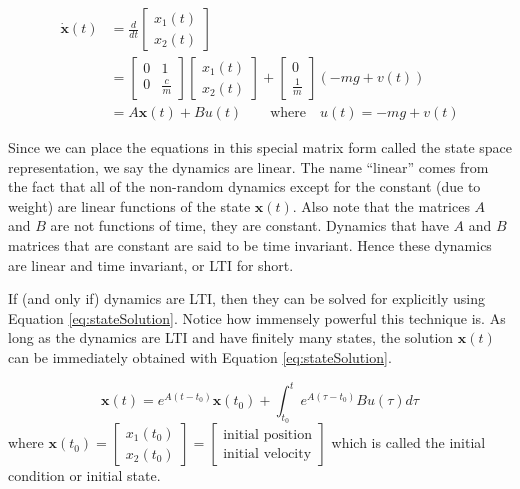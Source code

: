 \documentclass{article}
\begin{document}
\begin{align}
\label{eq:stateSpaceDynamics}
\dot{\pmb{x}}(t) &= \frac{d}{dt}\begin{bmatrix}x_1(t)\\x_2(t)\end{bmatrix} \nonumber\\
&=\begin{bmatrix} 0 & 1\\ 0 & \frac{c}{m}\end{bmatrix} \begin{bmatrix}x_1(t) \\ x_2(t)\end{bmatrix}+\begin{bmatrix}0\\\frac{1}{m}\end{bmatrix}(-mg+v(t)) \nonumber\\
&= A\pmb{x}(t)+Bu(t) \qquad \textrm{where} \quad u(t) = -mg+v(t)
\end{align}

Since we can place the equations in this special matrix form called the state space representation, we say the dynamics are linear.  The name ``linear'' comes from the fact that all of the non-random dynamics except for the constant (due to weight) are linear functions of the state $\pmb{x}(t)$.  Also note that the matrices $A$ and $B$ are not functions of time, they are constant.  Dynamics that have $A$ and $B$ matrices that are constant are said to be time invariant.  Hence these dynamics are linear and time invariant, or LTI for short.

If (and only if) dynamics are LTI, then they can be solved for explicitly using Equation \ref{eq:stateSolution}.  Notice how immensely powerful this technique is.  As long as the dynamics are LTI and have finitely many states, the solution $\pmb{x}(t)$ can be immediately obtained with Equation \ref{eq:stateSolution}.  

\begin{equation}
\label{eq:stateSolution}
\pmb{x}(t)=e^{A(t-t_0)}\pmb{x}(t_0)+\int_{t_0}^te^{A(\tau-t_0)}Bu(\tau)d\tau
\end{equation}
where $\pmb{x}(t_0)=\begin{bmatrix}x_1(t_0)\\x_2(t_0)\end{bmatrix}=\begin{bmatrix}\textrm{initial position}\\\textrm{initial velocity}\end{bmatrix}$ which is called the initial condition or initial state.
\end{document}
